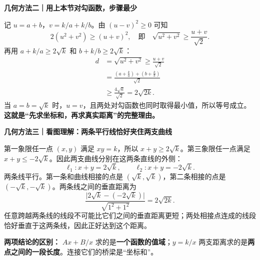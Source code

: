 \begin{proofbox}
\textbf{几何方法二｜用上本节对勾函数，步骤最少}



记 $u=a+b$，$v=k/a+k/b$。由 $(u-v)^2\ge0$ 可知
\[
2(u^2+v^2)\ge(u+v)^2,
\quad\text{即}\quad
\sqrt{u^2+v^2}\ge\frac{u+v}{\sqrt2}.
\]
再用 $a+k/a\ge2\sqrt{k}$ 和 $b+k/b\ge2\sqrt{k}$：
\[
\begin{aligned}
d&=\sqrt{u^2+v^2}\ge\frac{u+v}{\sqrt2}\\
&=\frac{\left(a+\frac ka\right)+\left(b+\frac kb\right)}{\sqrt2}\\
&\ge\frac{4\sqrt{k}}{\sqrt2}=2\sqrt{2k}.
\end{aligned}
\]
当 $a=b=\sqrt{k}$ 时，$u=v$，且两处对勾函数也同时取得最小值，所以等号成立。\textbf{这就是“先求坐标和，再求真实距离”的完整理由。}

\medskip
\end{proofbox}
\clearpage
\begin{proofbox}
\textbf{几何方法三｜看图理解：两条平行线恰好夹住两支曲线}

第一象限任一点 $(x,y)$ 满足 $xy=k$，所以 $x+y\ge2\sqrt{k}$。第三象限任一点满足 $x+y\le-2\sqrt{k}$。因此两支曲线分别在这两条直线的外侧：
\[
\ell_1:x+y=2\sqrt{k},\qquad
\ell_2:x+y=-2\sqrt{k}.
\]
两条线平行。第一条和曲线相接的点是 $(\sqrt{k},\sqrt{k})$，第二条相接的点是 $(-\sqrt{k},-\sqrt{k})$。两条线之间的垂直距离为
\[
\frac{\bigl|2\sqrt{k}-(-2\sqrt{k})\bigr|}{\sqrt{1^2+1^2}}
=2\sqrt{2k}.
\]
任意跨越两条线的线段不可能比它们之间的垂直距离更短；两处相接点连成的线段恰好垂直于这两条线，因此正好达到这个距离。

\medskip
\textbf{两项结论的区别：} $Ax+B/x$ 求的是\textbf{一个函数的值域}；$y=k/x$ 两支距离求的是\textbf{两点之间的一段长度}。连接它们的桥梁是“坐标和”。
\end{proofbox}


